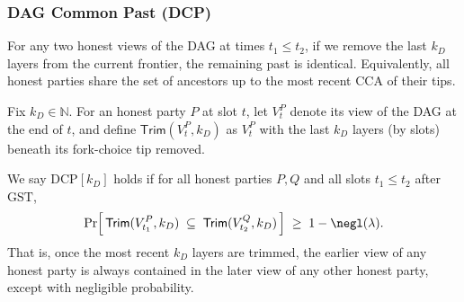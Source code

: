 \subsubsection{DAG Common Past (DCP)}
\label{sec:DCP}

For any two honest views of the DAG at times $t_1\le t_2$, if we remove the last $k_D$ layers from the current frontier, the remaining past is identical. Equivalently, all honest parties share the set of ancestors up to the most recent CCA of their tips.

\begin{definition}\label{def:DCP}
Fix $k_D \in \mathbb{N}$. For an honest party $P$ at slot $t$, let $V_t^P$ denote
its view of the DAG at the end of $t$, and define
$\mathsf{Trim}(V_t^P,k_D)$ as $V_t^P$ with the last $k_D$ layers (by slots)
beneath its fork-choice tip removed.

We say $\mathrm{DCP}[k_D]$ holds if for all honest parties $P,Q$ and all slots
$t_1 \le t_2$ after $\mathrm{GST}$,
\[
\Pr\!\Big[\, \mathsf{Trim}(V_{t_1}^P,k_D)\;\subseteq\;\mathsf{Trim}(V_{t_2}^Q,k_D)\,\Big]
\;\ge\; 1-\negl(\lambda).
\]
That is, once the most recent $k_D$ layers are trimmed, the earlier view of
any honest party is always contained in the later view of any other honest party,
except with negligible probability.
\end{definition}



